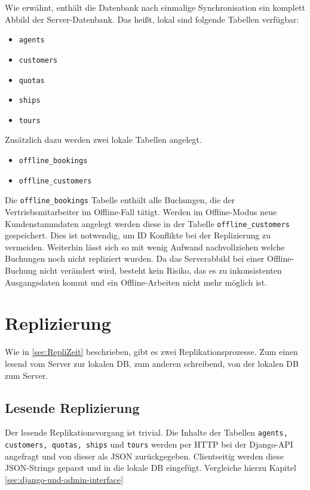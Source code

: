 \documentclass[12pt,a4paper,ngerman,english]{report}
\begin{document}
Wie erwähnt, enthält die Datenbank nach einmalige Synchronisation ein komplett Abbild der Server-Datenbank. Das heißt, lokal sind folgende Tabellen verfügbar:
\begin{itemize}
	\setlength\itemsep{0.1em}
	\item \texttt{agents}
	\item \texttt{customers}
	\item \texttt{quotas}
	\item \texttt{ships}
	\item \texttt{tours}
\end{itemize}
Zusätzlich dazu werden zwei lokale Tabellen angelegt.
\begin{itemize}
	\setlength\itemsep{0.1em}
	\item \texttt{offline\_bookings}
	\item \texttt{offline\_customers}
\end{itemize}
Die \texttt{offline\_bookings} Tabelle enthält alle Buchungen, die der Vertriebsmitarbeiter im Offline-Fall tätigt. Werden im Offline-Modus neue Kundenstammdaten angelegt werden diese in der Tabelle \texttt{offline\_customers} gespeichert. Dies ist notwendig, um ID Konflikte bei der Replizierung zu vermeiden. Weiterhin lässt sich so mit wenig Aufwand nachvollziehen welche Buchungen noch nicht repliziert wurden. Da das Serverabbild bei einer Offline-Buchung nicht verändert wird, besteht kein Risiko, das es zu inkonsistenten Ausgangsdaten kommt und ein Offline-Arbeiten nicht mehr möglich ist.

\section{Replizierung}
\label{sec:Replizierung}

Wie in \autoref{sec:RepliZeit} beschrieben, gibt es zwei Replikationsprozesse. Zum einen lesend vom Server zur lokalen DB, zum anderen schreibend, von der lokalen DB zum Server.

\subsection{Lesende Replizierung}

Der lesende Replikationsvorgang ist trivial. Die Inhalte der Tabellen \texttt{agents, customers, quotas, ships} und \texttt{tours} werden per HTTP bei der Django-API angefragt und von dieser als JSON zurückgegeben. Clientseitig werden diese JSON-Strings geparst und in die lokale DB eingefügt. Vergleiche hierzu Kapitel \ref{sec:django-und-admin-interface}
\end{document}
